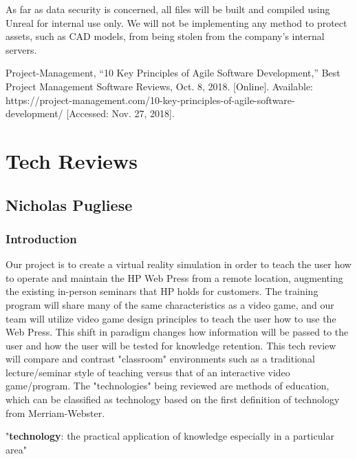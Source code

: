 \documentclass[onecolumn, draftclsnofoot,10pt, compsoc]{IEEEtran}
\begin{document}
As far as data security is concerned, all files will be built and compiled using Unreal for internal use only. We will not be implementing any method to protect assets, such as CAD models, from being stolen from the company's internal servers.
\begin{thebibliography}{}
Project-Management, “10 Key Principles of Agile Software Development,” Best Project Management Software Reviews, Oct. 8, 2018. [Online]. Available: https://project-management.com/10-key-principles-of-agile-software-development/ [Accessed: Nov. 27, 2018].
\end{thebibliography}


\newpage
\section{Tech Reviews}

\subsection{Nicholas Pugliese}
\subsubsection{Introduction}
Our project is to create a virtual reality simulation in order to teach the user how to operate and maintain the HP Web Press from a remote location, augmenting the existing in-person seminars that HP holds for customers. The training program will share many of the same characteristics as a video game, and our team will utilize video game design principles to teach the user how to use the Web Press. This shift in paradigm changes how information will be passed to the user and how the user will be tested for knowledge retention. This tech review will compare and contrast "classroom" environments such as a traditional lecture/seminar style of teaching versus that of an interactive video game/program. The "technologies" being reviewed are methods of education, which can be classified as technology based on the first definition of technology from Merriam-Webster.

\begin{displayquote}
"\textbf{technology}: the practical application of knowledge especially in a particular area"
\end{displayquote}
\end{document}
